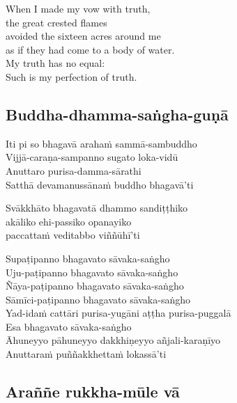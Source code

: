 When I made my vow with truth,\\
the great crested flames\\
avoided the sixteen acres around me\\
as if they had come to a body of water.\\
My truth has no equal:\\
Such is my perfection of truth.

\subsection{Buddha-dhamma-saṅgha-guṇā}
\label{iti-pi-so}


\begin{paritta}
Iti pi so bhagavā arahaṁ sammā-sambuddho\\
Vijjā-caraṇa-sampanno sugato loka-vidū\\
Anuttaro purisa-damma-sārathi\\
Satthā devamanussānaṁ buddho bhagavā'ti

Svākkhāto bhagavatā dhammo sandiṭṭhiko\\
\vin akāliko ehi-passiko opanayiko\\
paccattaṁ veditabbo viññūhī'ti

Supaṭipanno bhagavato sāvaka-saṅgho\\
Uju-paṭipanno bhagavato sāvaka-saṅgho\\
Ñāya-paṭipanno bhagavato sāvaka-saṅgho\\
Sāmīci-paṭipanno bhagavato sāvaka-saṅgho\\
Yad-idaṁ cattāri purisa-yugāni aṭṭha purisa-puggalā\\
Esa bhagavato sāvaka-saṅgho\\
Āhuneyyo pāhuneyyo dakkhiṇeyyo añjali-karaṇīyo\\
Anuttaraṁ puññakkhettaṁ lokassā'ti
\end{paritta}

\subsection{Araññe rukkha-mūle vā}


